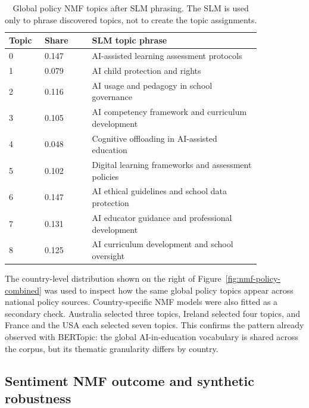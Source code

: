 \documentclass{article}
\begin{document}
\begin{table}[h]
\centering
\small
\begin{tabular}{p{0.10\linewidth}p{0.16\linewidth}p{0.58\linewidth}}
\hline
Topic & Share & SLM topic phrase \\
\hline
0 & 0.147 & AI-assisted learning assessment protocols \\
1 & 0.079 & AI child protection and rights \\
2 & 0.116 & AI usage and pedagogy in school governance \\
3 & 0.105 & AI competency framework and curriculum development \\
4 & 0.048 & Cognitive offloading in AI-assisted education \\
5 & 0.102 & Digital learning frameworks and assessment policies \\
6 & 0.147 & AI ethical guidelines and school data protection \\
7 & 0.131 & AI educator guidance and professional development \\
8 & 0.125 & AI curriculum development and school oversight \\
\hline
\end{tabular}
\caption{Global policy NMF topics after SLM phrasing. The SLM is used only to phrase discovered topics, not to create the topic assignments.}
\label{tab:nmf-policy-global-topics}
\end{table}

The country-level distribution shown on the right of
Figure~\ref{fig:nmf-policy-combined} was used to inspect how the same global policy
topics appear across national policy sources. Country-specific NMF models were also
fitted as a secondary check. Australia selected three topics, Ireland selected four
topics, and France and the USA each selected seven topics. This confirms the pattern
already observed with BERTopic: the global AI-in-education vocabulary is shared across
the corpus, but its thematic granularity differs by country.

\subsection{Sentiment NMF outcome and synthetic robustness}
\end{document}
